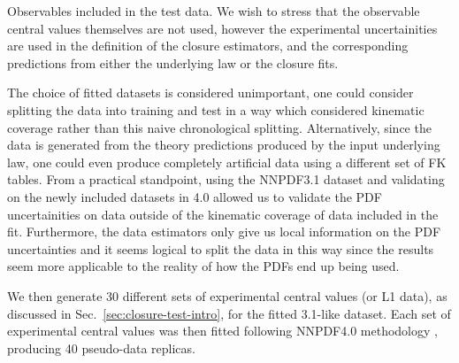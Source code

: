 \begin{table}[h!]
    \begin{center}
        
    \end{center}
    \caption{
        Observables included in the test data. We wish to stress that the observable
        central values themselves are not used, however the experimental
        uncertainities are used in the definition of the closure estimators, and
        the corresponding predictions from either the underlying law or the
        closure fits.
    }
    \label{tab:summarise_new_data}
\end{table}

The choice of fitted datasets is
considered unimportant, one could consider splitting the data into training
and test in a way which considered kinematic coverage rather than this
naive chronological splitting. Alternatively, since the data is generated from
the theory predictions produced by the input underlying law, one could even
produce completely artificial data using a different set of FK tables. From a
practical standpoint, using the NNPDF3.1 dataset and validating on the newly
included
datasets in 4.0 allowed us to validate the PDF uncertainities on data outside
of the kinematic coverage of data included in the fit. Furthermore, the data estimators
only give us local information on the PDF uncertainties and it seems
logical to split the data in this way since the results seem more applicable to
the reality of how the PDFs end up being used.

We then generate 30 different sets of experimental central values
(or L1 data), as discussed in Sec.~\ref{sec:closure-test-intro}, for the
fitted 3.1-like dataset.
Each set of experimental central values was then
fitted following NNPDF4.0 methodology \cite{NNPDF40},
producing 40 pseudo-data replicas.
